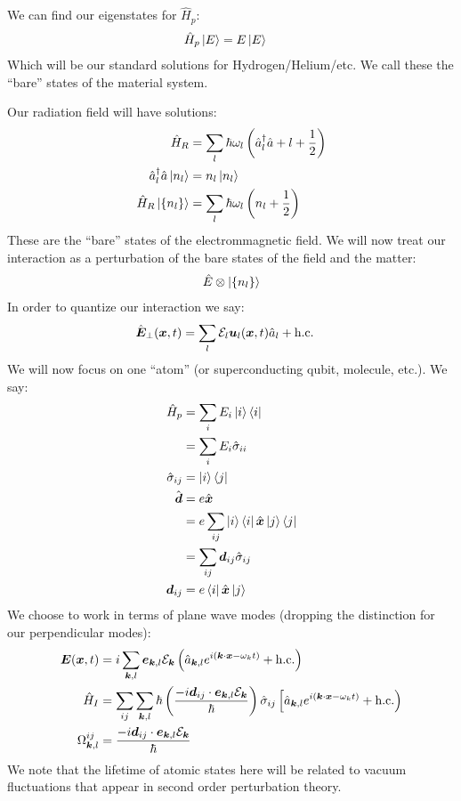 We can find our eigenstates for $\hat{H}_p$:
\begin{align*}
	\hat{H}_p \ket{E} &= E\ket{E}
\end{align*}
Which will be our standard solutions for Hydrogen/Helium/etc. We call these the ``bare'' states of the material system.

Our radiation field will have solutions:
\begin{align*}
	\hat{H}_R &= \sum_l \hbar\omega_l \left(\hat{a}_l^\dagger\hat{a}+l +\frac{1}{2}\right) \\
	\hat{a}^\dagger_l\hat{a}\ket{n_l} &= n_l\ket{n_l} \\
	\hat{H}_R\ket{\{n_l\}} &= \sum_l \hbar\omega_l\left(n_l + \frac{1}{2}\right)
\end{align*}
These are the ``bare'' states of the electrommagnetic field.
We will now treat our interaction as a perturbation of the bare states of the field and the matter:
\begin{align*}
	\hat{E} \otimes \ket{\{n_l\}}
\end{align*}
In order to quantize our interaction we say:
\begin{align*}
	\hat{\bm{E}}_\perp(\bm{x},t) &= \sum_l \mathcal{E}_l \bm{u}_l(\bm{x},t) \hat{a}_l + \text{h.c.}
\end{align*}
We will now focus on one ``atom'' (or superconducting qubit, molecule, etc.). We say:
\begin{align*}
	\hat{H}_p &= \sum_i E_i \ket{i}\bra{i} \\
	&= \sum_i E_i \hat{\sigma}_{ii} \\
	\hat{\sigma}_{ij} &= \ket{i}\bra{j} \\
	\hat{\bm{d}} &= e\hat{\bm{x}} \\
	&= e\sum_{ij} \ket{i}\bra{i}\hat{\bm{x}} \ket{j}\bra{j} \\
	&= \sum_{ij} \bm{d}_{ij}\hat{\sigma}_{ij} \\
	\bm{d}_{ij} &= e\bra{i}\hat{\bm{x}}\ket{j}
\end{align*}
We choose to work in terms of plane wave modes (dropping the distinction for our perpendicular modes):
\begin{align*}
	\bm{E}(\bm{x},t) &= i\sum_{\bm{k},l} \bm{e}_{\bm{k},l}\mathcal{E}_{\bm{k}}\left(\hat{a}_{\bm{k},l} e^{i(\bm{k}\cdot\bm{x} -\omega_kt)}  + \text{h.c.}\right) \\
	\hat{H}_I &= \sum_{ij}\sum_{\bm{k},l} \hbar\left(\frac{-i\bm{d}_{ij}\cdot\bm{e}_{\bm{k},l} \mathcal{E}_{\bm{k}}}{\hbar}\right) \hat{\sigma}_{ij}\left[\hat{a}_{\bm{k},l} e^{i(\bm{k}\cdot\bm{x} -\omega_k t)} +\text{h.c.}\right) \\
	\Omega_{\bm{k},l}^{ij} &= \frac{-i\bm{d}_{ij}\cdot\bm{e}_{\bm{k},l}\mathcal{E}_{\bm{k}}}{\hbar}
\end{align*}
We note that the lifetime of atomic states here will be related to vacuum fluctuations that appear in second order perturbation theory.


